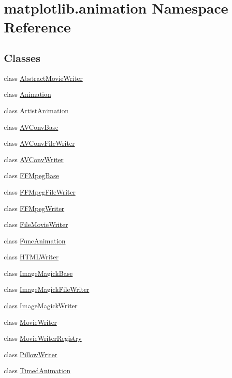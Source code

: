 \hypertarget{namespacematplotlib_1_1animation}{}\section{matplotlib.\+animation Namespace Reference}
\label{namespacematplotlib_1_1animation}
\subsection*{Classes}
\begin{DoxyCompactItemize}
\item 
class \hyperlink{classmatplotlib_1_1animation_1_1AbstractMovieWriter}{Abstract\+Movie\+Writer}
\item 
class \hyperlink{classmatplotlib_1_1animation_1_1Animation}{Animation}
\item 
class \hyperlink{classmatplotlib_1_1animation_1_1ArtistAnimation}{Artist\+Animation}
\item 
class \hyperlink{classmatplotlib_1_1animation_1_1AVConvBase}{A\+V\+Conv\+Base}
\item 
class \hyperlink{classmatplotlib_1_1animation_1_1AVConvFileWriter}{A\+V\+Conv\+File\+Writer}
\item 
class \hyperlink{classmatplotlib_1_1animation_1_1AVConvWriter}{A\+V\+Conv\+Writer}
\item 
class \hyperlink{classmatplotlib_1_1animation_1_1FFMpegBase}{F\+F\+Mpeg\+Base}
\item 
class \hyperlink{classmatplotlib_1_1animation_1_1FFMpegFileWriter}{F\+F\+Mpeg\+File\+Writer}
\item 
class \hyperlink{classmatplotlib_1_1animation_1_1FFMpegWriter}{F\+F\+Mpeg\+Writer}
\item 
class \hyperlink{classmatplotlib_1_1animation_1_1FileMovieWriter}{File\+Movie\+Writer}
\item 
class \hyperlink{classmatplotlib_1_1animation_1_1FuncAnimation}{Func\+Animation}
\item 
class \hyperlink{classmatplotlib_1_1animation_1_1HTMLWriter}{H\+T\+M\+L\+Writer}
\item 
class \hyperlink{classmatplotlib_1_1animation_1_1ImageMagickBase}{Image\+Magick\+Base}
\item 
class \hyperlink{classmatplotlib_1_1animation_1_1ImageMagickFileWriter}{Image\+Magick\+File\+Writer}
\item 
class \hyperlink{classmatplotlib_1_1animation_1_1ImageMagickWriter}{Image\+Magick\+Writer}
\item 
class \hyperlink{classmatplotlib_1_1animation_1_1MovieWriter}{Movie\+Writer}
\item 
class \hyperlink{classmatplotlib_1_1animation_1_1MovieWriterRegistry}{Movie\+Writer\+Registry}
\item 
class \hyperlink{classmatplotlib_1_1animation_1_1PillowWriter}{Pillow\+Writer}
\item 
class \hyperlink{classmatplotlib_1_1animation_1_1TimedAnimation}{Timed\+Animation}
\end{DoxyCompactItemize}
